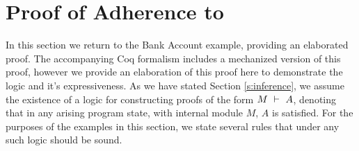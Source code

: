 \section{Proof of Adherence to }
\label{s:examples}

In this section we return to the Bank Account example, 
providing an elaborated proof. 
The accompanying Coq formalism includes a mechanized version of this proof,
however we provide an elaboration of this proof here to demonstrate the logic
and it's expressiveness.
As we have stated Section \ref{s:inference}, 
we assume the existence of a logic for constructing proofs
of the form $M\ \vdash\ A$, denoting that in 
any arising program state, with internal module $M$, $A$ is satisfied. 
For the purposes of the examples in this section, we state several 
rules that under any such logic should be sound.
{\footnotesize
{}
\normalsize}

